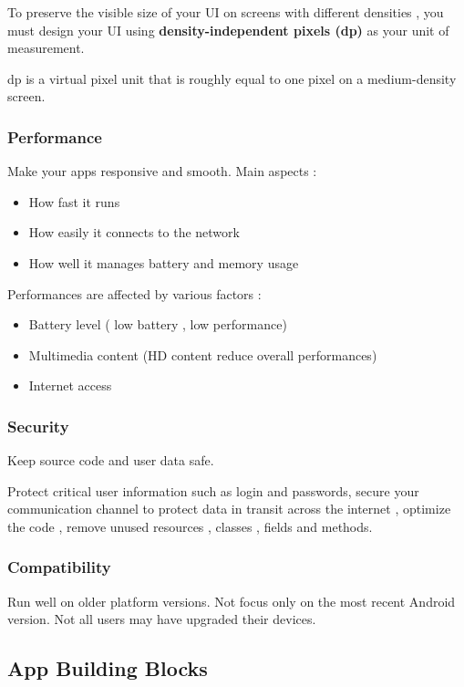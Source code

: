 \documentclass{article}
\begin{document}
To preserve the visible size of your UI on screens with different densities , you must design your UI using \textbf{density-independent pixels (dp)} as your unit of measurement.

dp is a virtual pixel unit that is roughly equal to one pixel on a medium-density screen.

\subsubsection{Performance}

Make your apps responsive and smooth. Main aspects :

\begin{itemize}
    \item How fast it runs
    \item How easily it connects to the network
    \item How well it manages battery and memory usage
\end{itemize}

Performances are affected by various factors : 

\begin{itemize}
    \item Battery level ( low battery , low performance)
    \item Multimedia content (HD content reduce overall performances)
    \item Internet access
\end{itemize}

\subsubsection{Security}

Keep source code and user data safe.

Protect critical user information such as login and passwords, secure your communication channel to protect data in transit across the internet , optimize the code , remove unused resources , classes , fields and methods.

\subsubsection{Compatibility}

Run well on older platform versions. Not focus only on the most recent Android version. Not all users may have upgraded their devices.

\subsection{App Building Blocks}
\end{document}
